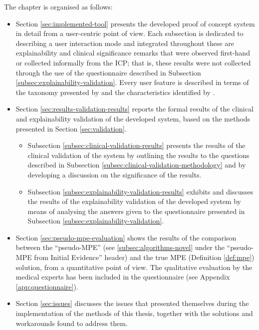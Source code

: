 The chapter is organised as follows:
\begin{itemize}
  \item Section \ref{sec:implemented-tool} presents the developed proof of concept system in detail from a user-centric point of view.
	  Each subsection is dedicated to describing a user interaction mode and integrated throughout these are explainability and clinical significance remarks that were observed first-hand or collected informally from the ICP; that is, these results were not collected through the use of the questionnaire described in Subsection \ref{subsec:explainability-validation}.
	  Every user feature is described in terms of the taxonomy presented by \citep{lacave2002review} and the characteristics identified by \citet{miller2018explanation}.
	\item Section \ref{sec:results-validation-results} reports the formal results of the clinical and explainability validation of the developed system, based on the methods presented in Section \ref{sec:validation}.
	\begin{itemize}
		  \item Subsection \ref{subsec:clinical-validation-results} presents the results of the clinical validation of the system by outlining the results to the questions described in Subsection \ref{subsec:clinical-validation-methodology} and by developing a discussion on the significance of the results.
		  \item Subsection \ref{subsec:explainability-validation-results} exhibits and discusses the results of the explainability validation of the developed system by means of analysing the answers given to the questionnaire presented in Subsection \ref{subsec:explainability-validation}.
	\end{itemize}
	\item Section \ref{sec:pseudo-mpe-evaluation} shows the results of the comparison between the \enquote{pseudo-MPE} (see \ref{subsec:algorithms-novel} under the \enquote{pseudo-MPE from Initial Evidence} header) and the true MPE (Definition \ref{def:mpe}) solution, from a quantitative point of view.
	The qualitative evaluation by the medical experts has been included in the questionnaire (see Appendix \ref{app:questionnaire}).
	\item Section \ref{sec:issues} discusses the issues that presented themselves during the implementation of the methods of this thesis, together with the solutions and workarounds found to address them.
\end{itemize}